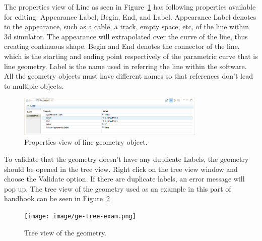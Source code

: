 The properties view of Line as seen in Figure~\ref{fig:ge-prop-line} has following properties available for editing: Appearance Label, Begin, End, and Label. Appearance Label denotes to the appearance, such as a cable, a track, empty space, etc, of the line within 3d simulator. The appearance will extrapolated over the curve of the line, thus creating continuous shape. Begin and End denotes the connector of the line, which is the starting and ending point respectively of the parametric curve that is line geometry. Label is the name used in referring the line within the software. All the geometry objects must have different names so that references don't lead to multiple objects.

\begin{figure}[htp]
\begin{center}
  \includegraphics[width=0.8\textwidth]{image/ge-prop-line.png}
  \caption{Properties view of line geometry object.}
  \label{fig:ge-prop-line}
\end{center}
\end{figure}

To validate that the geometry doesn't have any duplicate Labels, the geometry should be opened in the tree view. Right click on the tree view window and choose the Validate option. If there are duplicate labels, an error message will pop up. The tree view of the geometry used as an example in this part of handbook can be seen in Figure~\ref{fig:ge-tree-exam}

\begin{figure}[htp]
\begin{center}
  \texttt{[image: image/ge-tree-exam.png]}
  \caption{Tree view of the geometry.}
  \label{fig:ge-tree-exam}
\end{center}
\end{figure}

